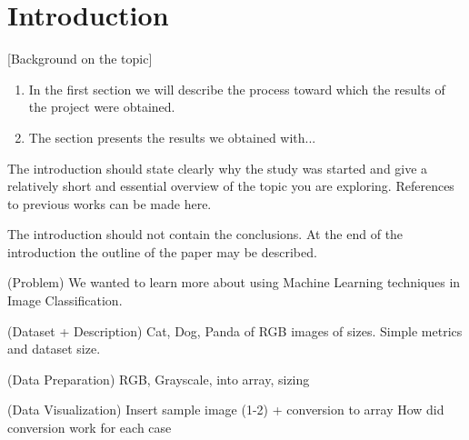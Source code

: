 \section{Introduction}
[Background on the topic]

\begin{enumerate}
\item In the first section we will describe the process toward which the results of the project were obtained.
\item The section presents the results we obtained with...
\end{enumerate}

The introduction should state clearly why the study was started
and give a relatively short and essential overview of the topic
you are exploring. References to previous works can be made here.
 
The introduction should not contain the conclusions. 
At the end of the introduction the outline of the paper may be described.


(Problem)
We wanted to learn more about using Machine Learning techniques in Image Classification.

(Dataset + Description)
Cat, Dog, Panda of RGB images of sizes. Simple metrics and dataset size.

(Data Preparation)
RGB, Grayscale, into array, sizing

(Data Visualization)
Insert sample image (1-2) + conversion to array
How did conversion work for each case


